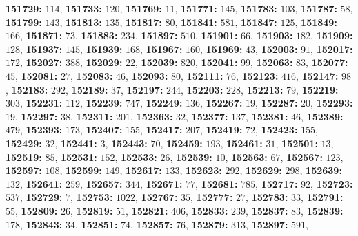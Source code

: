 \textsf{\bfseries 151729:} $114$, \textsf{\bfseries 151733:} $120$, \textsf{\bfseries 151769:} $11$, \textsf{\bfseries 151771:} $145$, \textsf{\bfseries 151783:} $103$, \textsf{\bfseries 151787:} $58$, \textsf{\bfseries 151799:} $143$, \textsf{\bfseries 151813:} $135$, \textsf{\bfseries 151817:} $80$, \textsf{\bfseries 151841:} $581$, \textsf{\bfseries 151847:} $125$, \textsf{\bfseries 151849:} $166$, \textsf{\bfseries 151871:} $73$, \textsf{\bfseries 151883:} $234$, \textsf{\bfseries 151897:} $510$, \textsf{\bfseries 151901:} $66$, \textsf{\bfseries 151903:} $182$, \textsf{\bfseries 151909:} $128$, \textsf{\bfseries 151937:} $145$, \textsf{\bfseries 151939:} $168$, \textsf{\bfseries 151967:} $160$, \textsf{\bfseries 151969:} $43$, \textsf{\bfseries 152003:} $91$, \textsf{\bfseries 152017:} $172$, \textsf{\bfseries 152027:} $388$, \textsf{\bfseries 152029:} $22$, \textsf{\bfseries 152039:} $820$, \textsf{\bfseries 152041:} $99$, \textsf{\bfseries 152063:} $83$, \textsf{\bfseries 152077:} $45$, \textsf{\bfseries 152081:} $27$, \textsf{\bfseries 152083:} $46$, \textsf{\bfseries 152093:} $80$, \textsf{\bfseries 152111:} $76$, \textsf{\bfseries 152123:} $416$, \textsf{\bfseries 152147:} $98$, \textsf{\bfseries 152183:} $292$, \textsf{\bfseries 152189:} $37$, \textsf{\bfseries 152197:} $244$, \textsf{\bfseries 152203:} $228$, \textsf{\bfseries 152213:} $79$, \textsf{\bfseries 152219:} $303$, \textsf{\bfseries 152231:} $112$, \textsf{\bfseries 152239:} $747$, \textsf{\bfseries 152249:} $136$, \textsf{\bfseries 152267:} $19$, \textsf{\bfseries 152287:} $20$, \textsf{\bfseries 152293:} $19$, \textsf{\bfseries 152297:} $38$, \textsf{\bfseries 152311:} $201$, \textsf{\bfseries 152363:} $32$, \textsf{\bfseries 152377:} $137$, \textsf{\bfseries 152381:} $46$, \textsf{\bfseries 152389:} $479$, \textsf{\bfseries 152393:} $173$, \textsf{\bfseries 152407:} $155$, \textsf{\bfseries 152417:} $207$, \textsf{\bfseries 152419:} $72$, \textsf{\bfseries 152423:} $155$, \textsf{\bfseries 152429:} $32$, \textsf{\bfseries 152441:} $3$, \textsf{\bfseries 152443:} $70$, \textsf{\bfseries 152459:} $193$, \textsf{\bfseries 152461:} $31$, \textsf{\bfseries 152501:} $13$, \textsf{\bfseries 152519:} $85$, \textsf{\bfseries 152531:} $152$, \textsf{\bfseries 152533:} $26$, \textsf{\bfseries 152539:} $10$, \textsf{\bfseries 152563:} $67$, \textsf{\bfseries 152567:} $123$, \textsf{\bfseries 152597:} $108$, \textsf{\bfseries 152599:} $149$, \textsf{\bfseries 152617:} $133$, \textsf{\bfseries 152623:} $292$, \textsf{\bfseries 152629:} $298$, \textsf{\bfseries 152639:} $132$, \textsf{\bfseries 152641:} $259$, \textsf{\bfseries 152657:} $344$, \textsf{\bfseries 152671:} $77$, \textsf{\bfseries 152681:} $785$, \textsf{\bfseries 152717:} $92$, \textsf{\bfseries 152723:} $537$, \textsf{\bfseries 152729:} $7$, \textsf{\bfseries 152753:} $1022$, \textsf{\bfseries 152767:} $35$, \textsf{\bfseries 152777:} $27$, \textsf{\bfseries 152783:} $33$, \textsf{\bfseries 152791:} $55$, \textsf{\bfseries 152809:} $26$, \textsf{\bfseries 152819:} $51$, \textsf{\bfseries 152821:} $406$, \textsf{\bfseries 152833:} $239$, \textsf{\bfseries 152837:} $83$, \textsf{\bfseries 152839:} $178$, \textsf{\bfseries 152843:} $34$, \textsf{\bfseries 152851:} $74$, \textsf{\bfseries 152857:} $76$, \textsf{\bfseries 152879:} $313$, \textsf{\bfseries 152897:} $591$, 

